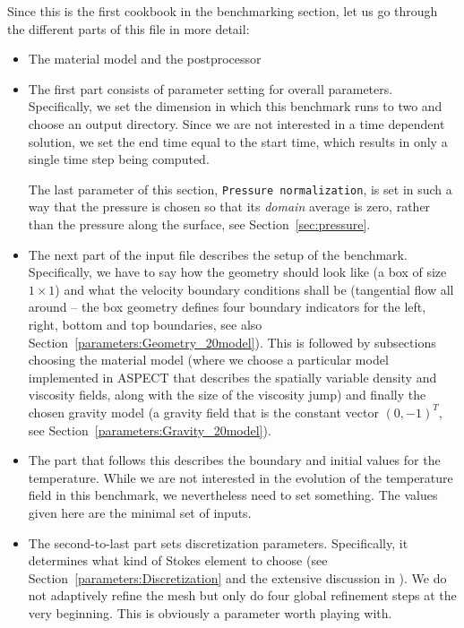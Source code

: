 \documentclass{article}
\newcommand{\aspect}{\textsc{ASPECT}}
\begin{document}
Since this is the first cookbook in the benchmarking section, let us go
through the different parts of this file in more detail:
\begin{itemize}
\item The material model and the postprocessor
\item The first part consists of parameter setting for overall
  parameters. Specifically, we set the dimension in which this benchmark runs
  to two and choose an output directory. Since we are not interested in a time
  dependent solution, we set the end time equal to the start time, which
  results in only a single time step being computed.

  The last parameter of this section, \texttt{Pressure normalization},
  is set in such a way that the pressure is chosen so that its \textit{domain}
  average is zero, rather than the pressure along the surface, see
  Section~\ref{sec:pressure}.

\item The next part of the input file describes the setup of the
  benchmark. Specifically, we have to say how the geometry should look like (a
  box of size $1\times 1$) and what the velocity boundary conditions shall be
  (tangential flow all around -- the box geometry defines four boundary
  indicators for the left, right, bottom and top boundaries, see also
  Section~\ref{parameters:Geometry_20model}). This is followed by subsections
  choosing the material model (where we choose a particular model implemented
  in \aspect{} that describes the spatially variable density and viscosity
  fields, along with the size of the viscosity jump) and finally the chosen
  gravity model (a gravity field that is the constant vector $(0,-1)^T$, see
  Section~\ref{parameters:Gravity_20model}).

\item The part that follows this describes the boundary and initial values for
  the temperature. While we are not interested in the evolution of the
  temperature field in this benchmark, we nevertheless need to set
  something. The values given here are the minimal set of inputs.

\item The second-to-last part sets discretization parameters. Specifically, it
  determines what kind of Stokes element to choose (see
  Section~\ref{parameters:Discretization} and the extensive discussion in
  \cite{KHB12}). We do not adaptively refine the mesh but only do four global
  refinement steps at the very beginning. This is obviously a parameter worth
  playing with.


\end{itemize}
\end{document}
